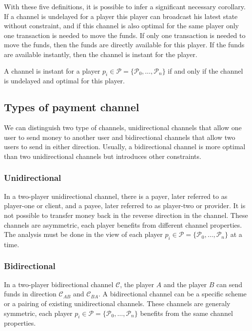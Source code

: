 With these five definitions, it is possible to infer a significant necessary
corollary. If a channel is undelayed for a player this player can broadcast his
latest state without constraint, and if this channel is also optimal for the
same player only one transaction is needed to move the funds. If only one
transaction is needed to move the funds, then the funds are directly available
for this player. If the funds are available instantly, then the channel is
instant for the player.

\begin{corollary}[Instant]
  A channel is instant for a player $p_i \in \mathcal{P} = \{\mathcal{P}_0, \dots,
  \mathcal{P}_n\}$ if and only if the channel is undelayed and optimal for this
  player.
\end{corollary}

\subsection{Types of payment channel}

We can distinguish two type of channels, unidirectional channels that allow
one user to send money to another user and bidirectional
channels that allow two users to send in either direction. Usually, a
bidirectional channel is more optimal than two unidirectional channels but
introduces other constraints.

\subsubsection{Unidirectional}

In a two-player unidirectional channel, there is a payer, later referred to as
player-one or client, and a payee, later referred to as player-two or provider.
It is not possible to transfer money back in the reverse direction in the
channel. These channels are asymmetric, each player benefits from different channel
properties. The analysis must be done in the view of each player $p_i \in
\mathcal{P} = \{\mathcal{P}_0, \dots, \mathcal{P}_n\}$ at a time.

\subsubsection{Bidirectional}

In a two-player bidirectional channel $\mathcal{C}$, the player $A$ and the
player $B$ can send funds in direction $\mathcal{C}_{AB}$ and
$\mathcal{C}_{BA}$. A bidirectional channel can be a specific scheme or a
pairing of existing unidirectional channels. These channels are generaly
symmetric, each player $p_i \in \mathcal{P} = \{\mathcal{P}_0, \dots,
\mathcal{P}_n\}$ benefits from the same channel properties.

